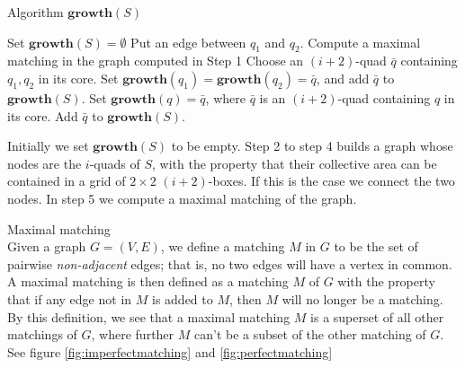 \begin{algorithm}[H]
	\caption{Algorithm $\mathbf{growth}(S)$} 
	\begin{algorithmic}[1]
		\State Set $\mathbf{growth}(S)=\emptyset$
                \State Put an edge between $q_1$ and $q_2$.
            \EndIf
        \EndFor
        \State Compute a maximal matching in the graph computed in Step 1
        	\State Choose an $(i+2)$-quad $\bar{q}$ containing $q_1, q_2$ in its core.
            \State Set $\mathbf{growth}(q_1)=\mathbf{growth}(q_2)=\bar{q}$, and add 
            	   $\bar{q}$ to $\mathbf{growth}(S)$.
        \EndFor
        	\State Set $\mathbf{growth}(q)=\bar{q}$, where $\bar{q}$ is an $(i+2)$-quad 
            	   containing $q$ in its core.
            \State Add $\bar{q}$ to $\mathbf{growth}(S)$.
        \EndFor
	\end{algorithmic} 
\end{algorithm}

Initially we set $\mathbf{growth}(S)$ to be empty. Step 2 to step 4 builds a graph whose 
nodes are the $i$-quads of $S$, with the property that their collective area can be contained 
in a grid of $2 \times 2$ $(i+2)$-boxes. If this is the case we connect the two nodes. In step 
5 we compute a maximal matching of the graph.

\begin{mydef} {Maximal matching} \\
Given a graph $G = (V,E)$, we define a matching $M$ in $G$ to be the set of pairwise 
\textit{non-adjacent} edges; that is, no two edges will have a vertex in common. A maximal 
matching is then defined as a matching $M$ of $G$ with the property that if any edge not in 
$M$ is added to $M$, then $M$ will no longer be a matching. By this definition, we see that 
a maximal matching $M$ is a superset of all other matchings of $G$, where further $M$ can't 
be a subset of the other matching of $G$. See figure \ref{fig:imperfectmatching} and 
\ref{fig:perfectmatching} 
\end{mydef}

